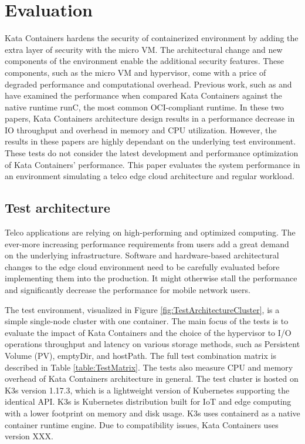 \chapter{Evaluation}
\label{chapter:evaluation}

Kata Containers hardens the security of containerized environment by adding the extra layer of security with the micro VM. The architectural change and new components of the environment enable the additional security features. These components, such as the micro VM and hypervisor, come with a price of degraded performance and computational overhead. Previous work, such as \cite{EverartsdeVelp2020} and \cite{Kumar2020} have examined the performance when compared Kata Containers against the native runtime runC, the most common OCI-compliant runtime. In these two papers, Kata Containers architecture design results in a performance decrease in IO throughput and overhead in memory and CPU utilization. However, the results in these papers are highly dependant on the underlying test environment. These tests do not consider the latest development and performance optimization of Kata Containers' performance. This paper evaluates the system performance in an environment simulating a telco edge cloud architecture and regular workload.

\section{Test architecture}
\label{section:test_architecture}

Telco applications are relying on high-performing and optimized computing. The ever-more increasing performance requirements from users add a great demand on the underlying infrastructure. Software and hardware-based architectural changes to the edge cloud environment need to be carefully evaluated before implementing them into the production. It might otherwise stall the performance and significantly decrease the performance for mobile network users.

The test environment, visualized in Figure \ref{fig:TestArchitectureCluster}, is a simple single-node cluster with one container. The main focus of the tests is to evaluate the impact of Kata Containers and the choice of the hypervisor to I/O operations throughput and latency on various storage methods, such as Persistent Volume (PV), emptyDir, and hostPath. The full test combination matrix is described in Table \ref{table:TestMatrix}. The tests also measure CPU and memory overhead of Kata Containers architecture in general. The test cluster is hosted on K3s\cite{K3s} version 1.17.3, which is a lightweight version of Kubernetes supporting the identical API. K3s is Kubernetes distribution built for IoT and edge computing with a lower footprint on memory and disk usage. K3s uses containerd as a native container runtime engine. Due to compatibility issues, Kata Containers uses version XXX.

